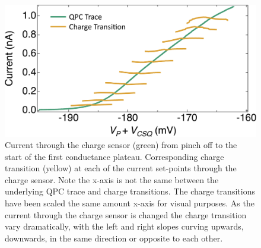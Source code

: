 \begin{figure}[ht]
  \begin{center}
    \includegraphics[width=1\textwidth]{figures/ch3/crop_PosterFiguresMaster.012.png}
    \caption[Charge transitions measured at various current set points through the charge sensor]{\label{fig:ch3/cond_occ_ct_setpoints} 
    Current through the charge sensor (green) from pinch off to the start of the first conductance plateau. Corresponding charge transition (yellow) at each of the current set-points through the charge sensor. Note the x-axis is not the same between the underlying QPC trace and charge transitions. The charge transitions have been scaled the same amount x-axis for visual purposes. As the current through the charge sensor is changed the charge transition vary dramatically, with the left and right slopes curving upwards, downwards, in the same direction or opposite to each other.}
  \end{center}
\end{figure}


